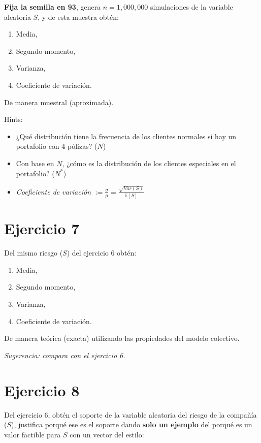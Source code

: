 \documentclass[
]{article}
\begin{document}
\textbf{Fija la semilla en 93}, genera \(n=1,000,000\) simulaciones de
la variable aleatoria \(S\), y de esta muestra obtén:

\begin{enumerate}[label=(\alph*)]
\item Media,
\item Segundo momento,
\item Varianza,
\item Coeficiente de variación.
\end{enumerate}

De manera muestral (aproximada).

Hints:

\begin{itemize}
\item
  ¿Qué distribución tiene la frecuencia de los clientes normales si hay
  un portafolio con 4 pólizas? (\(N\))
\item
  Con base en \(N\), ¿cómo es la distribución de los clientes especiales
  en el portafolio? (\(N^*\))
\item
  \emph{Coeficiente de variación}
  \(:= \frac{\sigma}{\mu} = \frac{\sqrt{Var(S)}}{\mathbb{E}[S]}\)
\end{itemize}

\hypertarget{ejercicio-7}{%
\section{Ejercicio 7}\label{ejercicio-7}}

Del mismo riesgo (\(S\)) del ejercicio 6 obtén:

\begin{enumerate}[label=(\alph*)]
\item Media,
\item Segundo momento,
\item Varianza,
\item Coeficiente de variación.
\end{enumerate}

De manera teórica (exacta) utilizando las propiedades del modelo
colectivo.

\emph{Sugerencia: compara con el ejercicio 6.}

\hypertarget{ejercicio-8}{%
\section{Ejercicio 8}\label{ejercicio-8}}

Del ejercicio 6, obtén el soporte de la variable aleatoria del riesgo de
la compañía (\(S\)), justifica porqué ese es el soporte dando
\textbf{solo un ejemplo} del porqué es un valor factible para \(S\) con
un vector del estilo:
\end{document}
